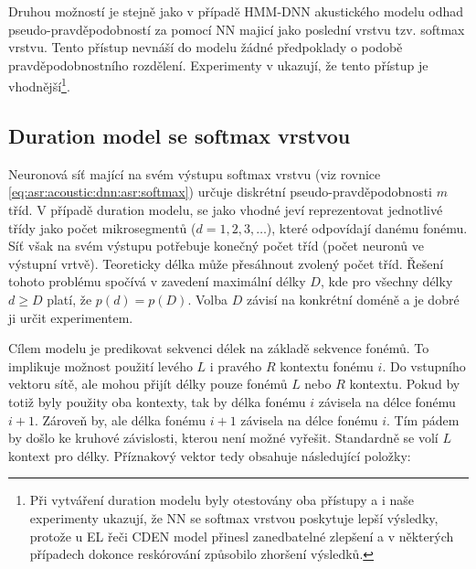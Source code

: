 Druhou možností je stejně jako v případě HMM-DNN akustického modelu odhad pseudo-pravděpodobností za pomocí NN majicí jako poslední vrstvu tzv. softmax vrstvu. Tento přístup nevnáší do modelu žádné předpoklady o podobě pravděpodobnostního rozdělení. Experimenty v \cite{Hadian2017} ukazují, že tento přístup je vhodnější\footnote{Při vytváření duration modelu byly otestovány oba přístupy a i naše experimenty ukazují, že NN se softmax vrstvou poskytuje lepší výsledky, protože u EL řeči CDEN model přinesl zanedbatelné zlepšení a v některých případech dokonce reskórování způsobilo zhoršení výsledků.}.

\subsection{Duration model se softmax vrstvou}
\label{chap:realisation:durationmodels:nn:softmax}

Neuronová síť mající na svém výstupu softmax vrstvu (viz rovnice \ref{eq:asr:acoustic:dnn:asr:softmax}) určuje diskrétní pseudo-pravděpodobnosti $m$ tříd. V případě duration modelu, se jako vhodné jeví reprezentovat jednotlivé třídy jako počet mikrosegmentů ($d=1,2,3,\dots$), které odpovídají danému fonému. Síť však na svém výstupu potřebuje konečný počet tříd (počet neuronů ve výstupní vrtvě). Teoreticky délka může přesáhnout zvolený počet tříd. Řešení tohoto problému spočívá v zavedení maximální délky $D$, kde pro všechny délky $d \geq D$ platí, že $p\left(d\right) = p\left(D\right)$. \cite{Hadian2017} Volba $D$ závisí na konkrétní doméně a je dobré ji určit experimentem.

Cílem modelu je predikovat sekvenci délek na základě sekvence fonémů. To implikuje možnost použití levého $L$ i pravého $R$ kontextu fonému $i$. Do vstupního vektoru sítě, ale mohou přijít délky pouze fonémů $L$ nebo $R$ kontextu. Pokud by totiž byly použity oba kontexty, tak by délka fonému $i$ závisela na délce fonému $i+1$. Zároveň by, ale délka fonému $i+1$ závisela na délce fonému $i$. Tím pádem by došlo ke kruhové závislosti, kterou není možné vyřešit. Standardně se volí $L$ kontext pro délky. Příznakový vektor tedy obsahuje následující položky:

